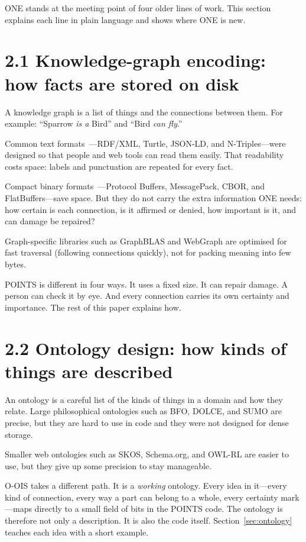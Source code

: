 \label{sec:related}

ONE stands at the meeting point of four older lines of work. This section explains each line in plain language and shows where ONE is new.

\section*{2.1 Knowledge-graph encoding: how facts are stored on disk}

A knowledge graph is a list of things and the connections between them. For example: ``Sparrow \textit{is a} Bird'' and ``Bird \textit{can fly}.''

Common text formats~\cite{rdf2014,jsonld2014}---RDF/XML, Turtle, JSON-LD, and N-Triples---were designed so that people and web tools can read them easily. That readability costs space: labels and punctuation are repeated for every fact.

Compact binary formats~\cite{protobuf2023,msgpack2023}---Protocol Buffers, MessagePack, CBOR, and FlatBuffers---save space. But they do not carry the extra information ONE needs: how certain is each connection, is it affirmed or denied, how important is it, and can damage be repaired?

Graph-specific libraries such as GraphBLAS and WebGraph are optimised for fast traversal (following connections quickly), not for packing meaning into few bytes.

POINTS is different in four ways. It uses a fixed size. It can repair damage. A person can check it by eye. And every connection carries its own certainty and importance. The rest of this paper explains how.

\section*{2.2 Ontology design: how kinds of things are described}

An ontology is a careful list of the kinds of things in a domain and how they relate. Large philosophical ontologies such as BFO, DOLCE, and SUMO are precise, but they are hard to use in code and they were not designed for dense storage.

Smaller web ontologies such as SKOS, Schema.org, and OWL-RL are easier to use, but they give up some precision to stay manageable.

O-OIS takes a different path. It is a \textit{working} ontology. Every idea in it---every kind of connection, every way a part can belong to a whole, every certainty mark---maps directly to a small field of bits in the POINTS code. The ontology is therefore not only a description. It is also the code itself. Section~\ref{sec:ontology} teaches each idea with a short example.

